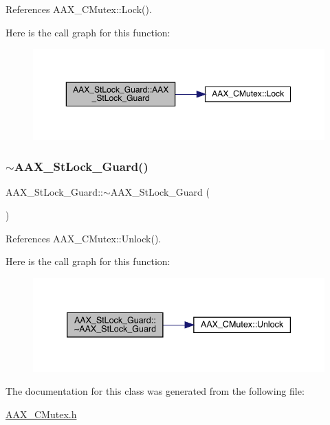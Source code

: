 References A\+A\+X\+\_\+\+C\+Mutex\+::\+Lock().

Here is the call graph for this function\+:
\nopagebreak
\begin{figure}[H]
\begin{center}
\leavevmode
\includegraphics[width=350pt]{a01505_abe7e3ad1ebe9ce3275abc7b23aba32d8_cgraph}
\end{center}
\end{figure}
\mbox{\label{a01505_abdc2e6d3f8de54078bbb823e742bb5fc}} 
\subsubsection{\texorpdfstring{$\sim$AAX\_StLock\_Guard()}{~AAX\_StLock\_Guard()}}
{\footnotesize\ttfamily A\+A\+X\+\_\+\+St\+Lock\+\_\+\+Guard\+::$\sim$\+A\+A\+X\+\_\+\+St\+Lock\+\_\+\+Guard (\begin{DoxyParamCaption}{ }\end{DoxyParamCaption})\hspace{0.3cm}{\ttfamily [inline]}}



References A\+A\+X\+\_\+\+C\+Mutex\+::\+Unlock().

Here is the call graph for this function\+:
\nopagebreak
\begin{figure}[H]
\begin{center}
\leavevmode
\includegraphics[width=339pt]{a01505_abdc2e6d3f8de54078bbb823e742bb5fc_cgraph}
\end{center}
\end{figure}


The documentation for this class was generated from the following file\+:\begin{DoxyCompactItemize}
\item 
\mbox{\hyperlink{a00443}{A\+A\+X\+\_\+\+C\+Mutex.\+h}}\end{DoxyCompactItemize}
